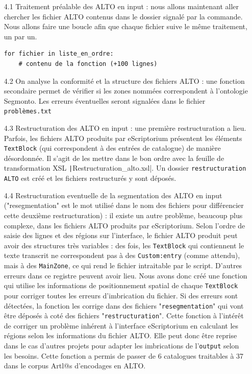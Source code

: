\documentclass[a4paper,12pt,twoside]{book}
\begin{document}
\begin{itemize}
\item [4.1] Traitement préalable des ALTO en input : nous allons maintenant aller chercher les fichier ALTO contenus dans le dossier signalé par la commande. Nous allons faire une boucle afin que chaque fichier suive le même traitement, un par un.
\begin{normalsize}
	\begin{verbatim}
for fichier in liste_en_ordre:
	# contenu de la fonction (+100 lignes)
	\end{verbatim}
\end{normalsize}
\item [4.2] On analyse la conformité et la structure des fichiers ALTO : une fonction secondaire permet de vérifier si les zones nommées correspondent à l'ontologie Segmonto. Les erreurs éventuelles seront signalées dans le fichier \texttt{problèmes.txt}

\item [4.3] Restructuration des ALTO en input : une première restructuration a lieu. Parfois, les fichiers ALTO produits par eScriptorium présentent les éléments \texttt{TextBlock} (qui correspondent à des entrées de catalogue) de manière désordonnée. Il s'agit de les mettre dans le bon ordre avec la feuille de transformation XSL \texttt|Restructuration_alto.xsl|. Un dossier \texttt{restructuration ALTO} est créé et les fichiers restructurés y sont déposés.

\item [4.4] Restructuration eventuelle de la segmentation des ALTO en input ("resegmentation" est le mot utilisé dans le nom des fichiers pour différencier cette deuxième restructuration) : il existe un autre problème, beaucoup plus complexe, dans les fichiers ALTO produits par eScriptorium. Selon l'ordre de saisie des lignes et des régions sur l'interface, le fichier ALTO produit peut avoir des structures très variables : des fois, les \texttt{TextBlock} qui contiennent le texte transcrit ne correspondent pas à des \texttt{Custom:entry} (comme attendu), mais à des \texttt{MainZone}, ce qui rend le fichier intraitable par le script. D'autres erreurs dans ce registre peuvent avoir lieu. Nous avons donc créé une fonction qui utilise les informations de positionnement spatial de chaque \texttt{TextBlock} pour corriger toutes les erreurs d'imbrication du fichier. Si des erreurs sont détectées, la fonction les corrige dans des fichiers "\texttt{resegmentation}" qui vont être déposés à coté des fichiers "\texttt{restructuration}". Cette fonction à l'intérêt de corriger un problème inhérent à l'interface eScriptorium en calculant les régions selon les informations du fichier ALTO. Elle peut donc être reprise dans le cas d'autres projets pour adapter les imbrications de l'\texttt{output} selon les besoins. Cette fonction a permis de passer de 6 catalogues traitables à 37 dans le corpus Artl@s d'encodages en ALTO.\\

\end{itemize}
\end{document}
